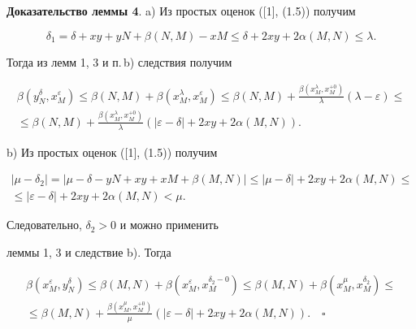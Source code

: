 {\bf Доказательство леммы 4}. a) Из простых оценок ([1], (1.5)) получим 


$$


\delta_{1} = \delta + xy + yN + \beta (N,M) - xM \leq


\delta + 2xy + 2\alpha (M,N) \leq \lambda. 


$$


Тогда из лемм 1, 3 и п.\,b) следствия получим


\begin{multline*}


\beta (y_{N}^{\delta },x_{M}^{\varepsilon }) \leq \beta (N,M) +


\beta (x_{M}^{\lambda },x_{M}^{\varepsilon }) \leq \beta (N,M) +


\frac{\beta(x_{M}^{\lambda },x_{M}^{+0})}{\lambda}(\lambda-\varepsilon)\leq\\


%


\le \beta (N,M) +\frac{\beta (x_{M}^{\lambda },x_{M}^{+ 0})}{\lambda }


(|\varepsilon - \delta | + 2xy + 2\alpha (M,N)).


\end{multline*}





b) Из простых оценок ([1], (1.5)) получим


\begin{multline*}


|\mu - \delta_{2}| = |\mu - \delta - yN + xy + xM + \beta (M,N)| \leq


|\mu - \delta | + 2xy + 2\alpha (M,N) \leq \\


%


\le |\varepsilon - \delta | + 2xy + 2\alpha (M,N) < \mu.


\end{multline*}


Следовательно, $\delta_{2} > 0$ и можно применить


леммы 1, 3 и следствие b). Тогда


\begin{multline*}


\beta (x_{M}^{\varepsilon },y_{N}^{\delta }) \leq \beta (M,N) +


\beta (x_{M}^{\varepsilon },x_{M}^{\delta_{2} - 0}) \leq \beta (M,N) +


\beta (x_{M}^{\mu },x_{M}^{\delta_{2}}) \leq \\


%


\le \beta (M,N) +\frac{\beta (x_{M}^{\mu },x_{M}^{+ 0})}{\mu }


(|\varepsilon - \delta | + 2xy + 2\alpha (M,N)).\quad\square


\end{multline*}





